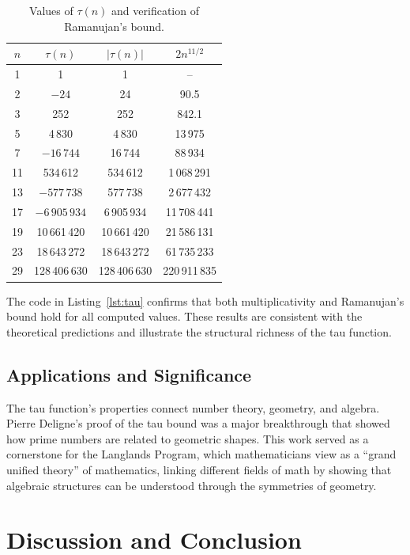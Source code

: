 \documentclass[10pt]{amsart}
\theoremstyle{plain}
\theoremstyle{definition}
\theoremstyle{remark}
\begin{document}
\begin{table}
\caption{Values of $\tau(n)$ and verification of Ramanujan's bound.}
\label{tab:tau}
\begin{tabular}{cccc}
\toprule
$n$ & $\tau(n)$ & $|\tau(n)|$ & $2n^{11/2}$ \\
\midrule
1 & 1 & 1 & -- \\
2 & $-24$ & 24 & 90.5 \\
3 & 252 & 252 & 842.1 \\
5 & 4\,830 & 4\,830 & 13\,975 \\
7 & $-16\,744$ & 16\,744 & 88\,934 \\
11 & 534\,612 & 534\,612 & 1\,068\,291 \\
13 & $-577\,738$ & 577\,738 & 2\,677\,432 \\
17 & $-6\,905\,934$ & 6\,905\,934 & 11\,708\,441 \\
19 & 10\,661\,420 & 10\,661\,420 & 21\,586\,131 \\
23 & 18\,643\,272 & 18\,643\,272 & 61\,735\,233 \\
29 & 128\,406\,630 & 128\,406\,630 & 220\,911\,835 \\
\bottomrule
\end{tabular}
\end{table}

The code in Listing~\ref{lst:tau} confirms that both multiplicativity
and Ramanujan's bound hold for all computed values. These results are
consistent with the theoretical predictions and illustrate the
structural richness of the tau function.

\subsection{Applications and Significance}

The tau function's properties connect number theory, geometry, and algebra. Pierre Deligne's proof of the tau bound was a major breakthrough that showed how prime numbers are related to geometric shapes. This work served as a cornerstone for the Langlands Program, which mathematicians view as a ``grand unified theory'' of mathematics, linking different fields of math by showing that algebraic structures can be understood through the symmetries of geometry.

\section{Discussion and Conclusion}
\label{sec:conclusion}
\end{document}
